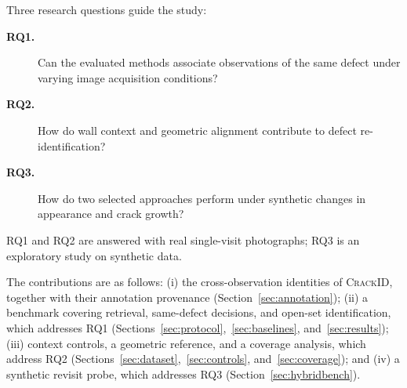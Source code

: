 Three research questions guide the study:
\begin{description}
  \item[\textbf{RQ1.}] Can the evaluated methods associate observations of the same defect under varying image acquisition conditions?
  \item[\textbf{RQ2.}] How do wall context and geometric alignment contribute to defect re-identification?
  \item[\textbf{RQ3.}] How do two selected approaches perform under synthetic changes in appearance and crack growth?
\end{description}
RQ1 and RQ2 are answered with real single-visit photographs; RQ3 is an exploratory study on synthetic data.

The contributions are as follows:
(i) the cross-observation identities of \textsc{CrackID}, together with their annotation provenance (Section~\ref{sec:annotation});
(ii) a benchmark covering retrieval, same-defect decisions, and open-set identification, which addresses RQ1 (Sections~\ref{sec:protocol},~\ref{sec:baselines}, and~\ref{sec:results});
(iii) context controls, a geometric reference, and a coverage analysis, which address RQ2 (Sections~\ref{sec:dataset},~\ref{sec:controls}, and~\ref{sec:coverage}); and
(iv) a synthetic revisit probe, which addresses RQ3 (Section~\ref{sec:hybridbench}).
